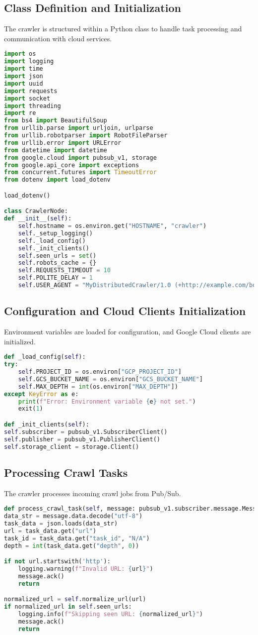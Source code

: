 \documentclass[12pt,a4paper]{report}
\begin{document}
\subsection{Class Definition and Initialization}
    The crawler is structured within a Python class to handle task processing and communication with cloud services.
\begin{lstlisting}[language=Python]
import os
import logging
import time
import json
import uuid
import requests
import socket
import threading
import re
from bs4 import BeautifulSoup
from urllib.parse import urljoin, urlparse
from urllib.robotparser import RobotFileParser
from urllib.error import URLError
from datetime import datetime
from google.cloud import pubsub_v1, storage
from google.api_core import exceptions
from concurrent.futures import TimeoutError
from dotenv import load_dotenv

load_dotenv()

class CrawlerNode:
def __init__(self):
    self.hostname = os.environ.get("HOSTNAME", "crawler")
    self._setup_logging()
    self._load_config()
    self._init_clients()
    self.seen_urls = set()
    self.robots_cache = {} 
    self.REQUESTS_TIMEOUT = 10
    self.POLITE_DELAY = 1
    self.USER_AGENT = "MyDistributedCrawler/1.0 (+http://example.com/botinfo)"
\end{lstlisting}
\newpage
\subsection{Configuration and Cloud Clients Initialization}
Environment variables are loaded for configuration, and Google Cloud clients are initialized.
\begin{lstlisting}[language=Python]
def _load_config(self):
try:
    self.PROJECT_ID = os.environ["GCP_PROJECT_ID"]
    self.GCS_BUCKET_NAME = os.environ["GCS_BUCKET_NAME"]
    self.MAX_DEPTH = int(os.environ["MAX_DEPTH"])
except KeyError as e:
    print(f"Error: Environment variable {e} not set.")
    exit(1)

def _init_clients(self):
self.subscriber = pubsub_v1.SubscriberClient()
self.publisher = pubsub_v1.PublisherClient()
self.storage_client = storage.Client()
\end{lstlisting}

\subsection{Processing Crawl Tasks}
The crawler processes incoming crawl jobs from Pub/Sub.
\begin{lstlisting}[language=Python]
def process_crawl_task(self, message: pubsub_v1.subscriber.message.Message):
data_str = message.data.decode("utf-8")
task_data = json.loads(data_str)
url = task_data.get("url")
task_id = task_data.get("task_id", "N/A")
depth = int(task_data.get("depth", 0))

if not url.startswith('http'):
    logging.warning(f"Invalid URL: {url}")
    message.ack()
    return

normalized_url = self.normalize_url(url)
if normalized_url in self.seen_urls:
    logging.info(f"Skipping seen URL: {normalized_url}")
    message.ack()
    return
\end{lstlisting}
\newpage
\end{document}
